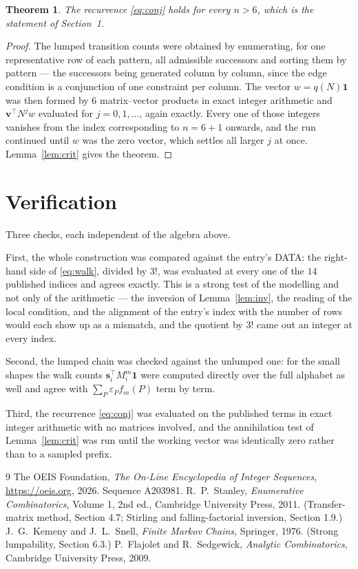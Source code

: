 \documentclass[11pt,a4paper]{article}
\theoremstyle{plain}
\newtheorem{theorem}{Theorem}
\theoremstyle{definition}
\begin{document}
\begin{theorem}
The recurrence \eqref{eq:conj} holds for every $n>6$, which is the statement of
Section~1.
\end{theorem}

\begin{proof}
The lumped transition counts were obtained by enumerating, for one representative row of
each pattern, all admissible successors and sorting them by pattern --- the successors being
generated column by column, since the edge condition is a conjunction of one constraint per
column. The vector $w=q(N)\mathbf{1}$ was then formed by $6$ matrix--vector products
in exact integer arithmetic and $\mathbf{v}^{\!\top}N^{j}w$ evaluated for
$j=0,1,\dots$, again exactly. Every one of those integers vanishes from the index
corresponding to $n=6+1$ onwards, and the run continued until $w$ was the zero vector,
which settles all larger $j$ at once. Lemma~\ref{lem:crit} gives the theorem.
\end{proof}

\section{Verification}

Three checks, each independent of the algebra above.

First, the whole construction was compared against the entry's DATA: the right-hand side of
\eqref{eq:walk}, divided by $3!$, was evaluated at every one of the $14$
published indices and agrees exactly. This is a strong test of the modelling and not only of
the arithmetic --- the inversion of Lemma~\ref{lem:inv}, the reading of the local
condition, and the alignment of the entry's index with the number of rows would each
show up as a mismatch, and the quotient by $3!$ came out an integer at every index.

Second, the lumped chain was checked against the unlumped one: for the small shapes the walk
counts $\mathbf{s}_i^{\!\top}M_i^{m}\mathbf{1}$ were computed directly over the full
alphabet as well and agree with $\sum_P\varepsilon_Pf_m(P)$ term by term.

Third, the recurrence \eqref{eq:conj} was evaluated on the published terms in exact integer
arithmetic with no matrices involved, and the annihilation test of Lemma~\ref{lem:crit} was
run until the working vector was identically zero rather than to a sampled prefix.

\begin{thebibliography}{9}
 The OEIS Foundation, \emph{The On-Line Encyclopedia of Integer
Sequences}, \url{https://oeis.org}, 2026. Sequence A203981.
 R.~P.~Stanley, \emph{Enumerative Combinatorics}, Volume 1, 2nd ed.,
Cambridge University Press, 2011. (Transfer-matrix method, Section 4.7; Stirling and
falling-factorial inversion, Section 1.9.)
 J.~G.~Kemeny and J.~L.~Snell, \emph{Finite Markov Chains}, Springer,
1976. (Strong lumpability, Section 6.3.)
 P.~Flajolet and R.~Sedgewick, \emph{Analytic Combinatorics}, Cambridge
University Press, 2009.
\end{thebibliography}
\end{document}
